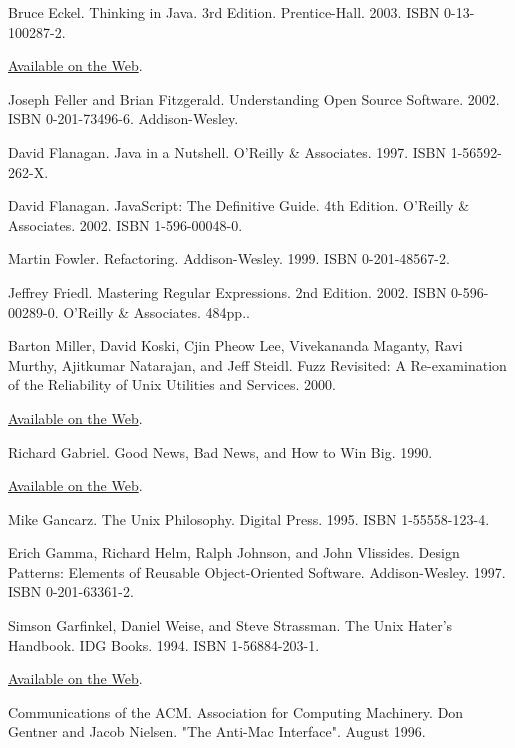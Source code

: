 \documentclass[12pt,oneside]{book}
\begin{document}
\begin{common-format}
\begin{thebibliography}{9}
 Bruce Eckel. Thinking in Java. 3rd Edition. Prentice-Hall. 2003. ISBN 0-13-100287-2.

\href{http://www.mindview.net/Books/TIJ/}{Available on the Web}.

 Joseph Feller and Brian Fitzgerald. Understanding Open Source Software. 2002. ISBN 0-201-73496-6. Addison-Wesley.

 David Flanagan. Java in a Nutshell. O'Reilly \&{} Associates. 1997. ISBN 1-56592-262-X.

 David Flanagan. JavaScript: The Definitive Guide. 4th Edition. O'Reilly \&{} Associates. 2002. ISBN 1-596-00048-0.

 Martin Fowler. Refactoring. Addison-Wesley. 1999. ISBN 0-201-48567-2.

 Jeffrey Friedl. Mastering Regular Expressions. 2nd Edition. 2002. ISBN 0-596-00289-0. O'Reilly \&{} Associates. 484pp..

 Barton Miller, David Koski, Cjin Pheow Lee, Vivekananda Maganty, Ravi Murthy, Ajitkumar Natarajan, and Jeff Steidl. Fuzz Revisited: A Re-examination of the Reliability of Unix Utilities and Services. 2000.

\href{http://www.opensource.org/advocacy/fuzz-revisited.pdf}{Available on the Web}.

 Richard Gabriel. Good News, Bad News, and How to Win Big. 1990.

\href{http://www.dreamsongs.com/WorseIsBetter.html}{Available on the Web}.

 Mike Gancarz. The Unix Philosophy. Digital Press. 1995. ISBN 1-55558-123-4.

 Erich Gamma, Richard Helm, Ralph Johnson, and John Vlissides. Design Patterns: Elements of Reusable Object-Oriented Software. Addison-Wesley. 1997. ISBN 0-201-63361-2.

 Simson Garfinkel, Daniel Weise, and Steve Strassman. The Unix Hater's Handbook. IDG Books. 1994. ISBN 1-56884-203-1.

\href{http://research.microsoft.com/~daniel/unix-haters.html}{Available on the Web}.

 Communications of the ACM. Association for Computing Machinery. Don Gentner and Jacob Nielsen. "The Anti-Mac Interface". August 1996.


\end{thebibliography}
\end{common-format}
\end{document}
